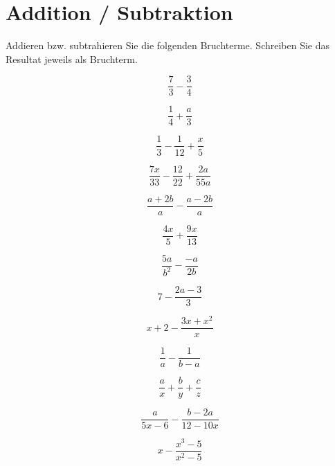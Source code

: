 {\begin{bbwAufgabenBlock}
\end{bbwAufgabenBlock}
\newpage
\section{Addition / Subtraktion}\label{bruchtermeAdditionSubtraktion}
Addieren bzw. subtrahieren Sie die folgenden Bruchterme. Schreiben Sie
das Resultat jeweils als Bruchterm.


\begin{bbwAufgabenBlock}
\item $$\frac73 - \frac34$$

\item $$\frac14 + \frac{a}{3}$$

\item $$\frac13 - \frac1{12} + \frac{x}5$$

\item $$\frac{7x}{33} - \frac{12}{22} + \frac{2a}{55a}$$

\item $$\frac{a+2b}{a} - \frac{a-2b}{a}$$

\item $$\frac{4x}5 + \frac{9x}{13}$$

\item $$\frac{5a}{b^2} - \frac{-a}{2b}$$

\item $$7 - \frac{2a-3}3 $$

\item $$x + 2 - \frac{3x+x^2}{x}$$

\item $$\frac1a - \frac1{b-a}$$

\item $$\frac{a}x + \frac{b}y + \frac{c}z$$

\item $$\frac{a}{5x-6} - \frac{b-2a}{12-10x}$$

\item $$x - \frac{x^3-5}{x^2-5}$$


\end{bbwAufgabenBlock}}

